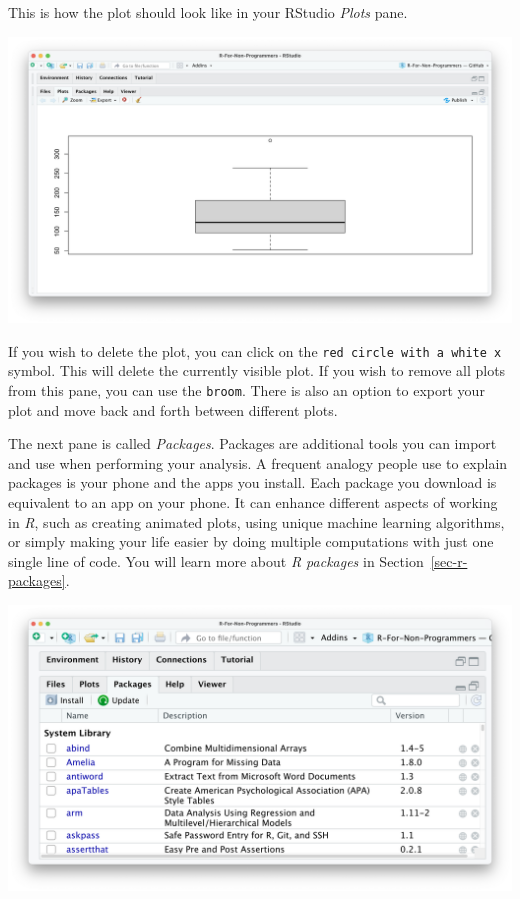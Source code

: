 \documentclass[
  letterpaper,
]{krantz}
\begin{document}
This is how the plot should look like in your RStudio \emph{Plots} pane.

\includegraphics{images/chapter_04_img/05_files_plots_etc/02_rstudio_plots.png}

If you wish to delete the plot, you can click on the
\texttt{red\ circle\ with\ a\ white\ x} symbol. This will delete the
currently visible plot. If you wish to remove all plots from this pane,
you can use the \texttt{broom}. There is also an option to export your
plot and move back and forth between different plots.

The next pane is called \emph{Packages}. Packages are additional tools
you can import and use when performing your analysis. A frequent analogy
people use to explain packages is your phone and the apps you install.
Each package you download is equivalent to an app on your phone. It can
enhance different aspects of working in \emph{R}, such as creating
animated plots, using unique machine learning algorithms, or simply
making your life easier by doing multiple computations with just one
single line of code. You will learn more about \emph{R packages} in
Section~\ref{sec-r-packages}.

\includegraphics{images/chapter_04_img/05_files_plots_etc/03_rstudio_packages.png}
\end{document}
